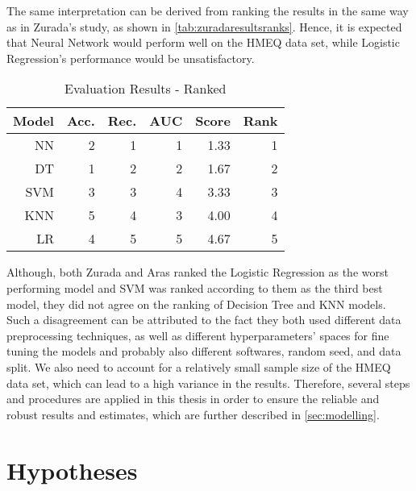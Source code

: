 The same interpretation can be derived from ranking the results in the same way as in Zurada's study, as shown in \autoref{tab:zuradaresultsranks}.
Hence, it is expected that Neural Network would perform well on the HMEQ data set, while Logistic Regression's performance would be unsatisfactory.
\begin{table}[H]
    \small
    \setlength{\tabcolsep}{8pt}
    \renewcommand{\arraystretch}{1.3}
    \centering
    \caption[Evaluation Results - Ranked \citep{zurada2014classification}]{Evaluation Results - Ranked \citep{zurada2014classification}}\label{tab:zuradaresultsranks}
    \begin{tabular}{r r r r r r}
    \toprule
    Model & Acc. & Rec. & AUC & Score & Rank \\
    \midrule
    \hline
    NN & 2 & 1 & 1 & 1.33 & 1 \\ 
    DT & 1 & 2 & 2 & 1.67 & 2 \\ 
    SVM & 3 & 3 & 4 & 3.33 & 3 \\ 
    KNN & 5 & 4 & 3 & 4.00 & 4 \\ 
    LR & 4 & 5 & 5 & 4.67 & 5 \\ 
    \hline
    \bottomrule
    \end{tabular}
    \vspace{0.35em}
    
    \vspace{-1em}
\end{table}

Although, both Zurada and Aras ranked the Logistic Regression as the worst performing model and SVM was ranked according to them as the third best model, they did not agree on the ranking of Decision Tree and KNN models.
Such a disagreement can be attributed to the fact they both used different data preprocessing techniques, as well as different hyperparameters' spaces for fine tuning the models and probably also different softwares, random seed, and data split.
We also need to account for a relatively small sample size of the HMEQ data set, which can lead to a high variance in the results.
Therefore, several steps and procedures are applied in this thesis in order to ensure the reliable and robust results and estimates, which are further described in \autoref{sec:modelling}.

\section{Hypotheses}

